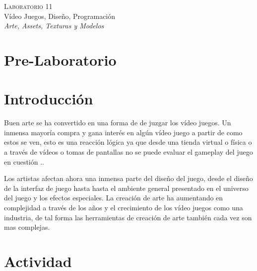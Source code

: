 \begin{center}
\textsc{\Large Laboratorio 11}~\\
{\large Vídeo Juegos, Diseño, Programación}~\\
\emph{Arte, Assets, Texturas y Modelos}
\end{center}

\section{Pre-Laboratorio}

\section{Introducción}
Buen arte se ha convertido en una forma de de juzgar los vídeo juegos. Un inmensa mayoría compra y gana interés en algún vídeo juego a partir de como estos se ven, esto es una reacción lógica ya que desde una tienda virtual o física o a través de vídeos o tomas de pantallas no se puede evaluar el gameplay del juego en cuestión \cite[p.~171]{bobbatesgamedesign}..

Los artistas afectan ahora una inmensa parte del diseño del juego, desde el diseño de la interfaz de juego hasta hasta el ambiente general presentado en el universo del juego y los efectos especiales. La creación de arte ha aumentando en complejidad a través de los años y el crecimiento de los vídeo juegos como una industria, de tal forma las herramientas de creación de arte también cada vez son mas complejas.
\section{Actividad}

